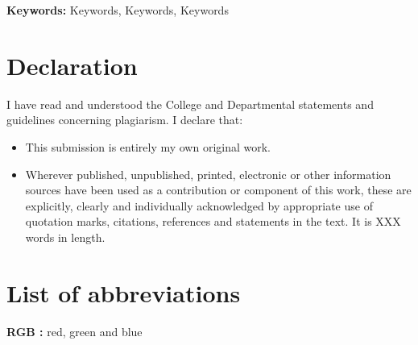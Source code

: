 \documentclass[12pt]{report}
\numberwithin{figure}{chapter}
\numberwithin{table}{chapter}
\numberwithin{equation}{chapter}
\begin{document}
\vspace{1cm}
\textbf{Keywords:} Keywords, Keywords, Keywords

\chapter*{Declaration}
\thispagestyle{fancy}

I have read and understood the College and Departmental statements and guidelines concerning plagiarism. I declare that:
\begin{itemize}
    \item This submission is entirely my own original work.
    \item Wherever published, unpublished, printed, electronic or other information sources have been used as a contribution or component of this work, these are explicitly, clearly and individually acknowledged by appropriate use of quotation marks, citations, references and statements in the text. It is XXX words in length.
\end{itemize}

\newpage 
\tableofcontents 
\thispagestyle{fancy}

\newpage 
\listoffigures%
\thispagestyle{fancy}

\newpage
\listoftables 
\thispagestyle{fancy}

\chapter*{List of abbreviations}
\thispagestyle{fancy}

\textbf{RGB :} red, green and blue



\end{document}
